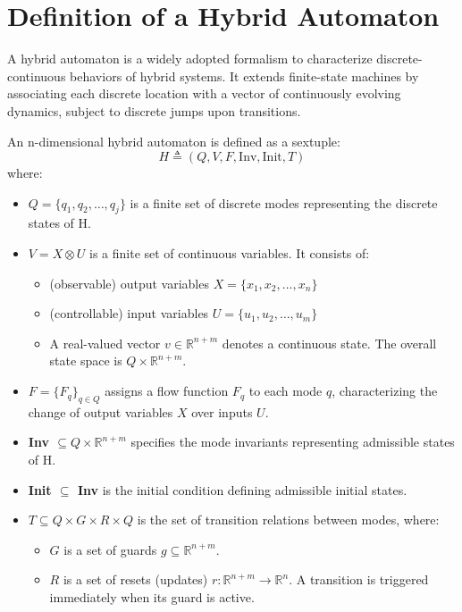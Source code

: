 \documentclass{article}
\begin{document}
\section*{Definition of a Hybrid Automaton}

A hybrid automaton is a widely adopted formalism to characterize discrete-continuous behaviors of hybrid systems. It extends finite-state machines by associating each discrete location with a vector of continuously evolving dynamics, subject to discrete jumps upon transitions.

An n-dimensional hybrid automaton is defined as a sextuple:
$$ H \triangleq (Q, V, F, \text{Inv}, \text{Init}, T) $$
where:
\begin{itemize}
    \item \textbf{$Q = \{q_1, q_2, \dots, q_j\}$} is a finite set of discrete modes representing the discrete states of H.
    
    \item \textbf{$V = X \otimes U$} is a finite set of continuous variables. It consists of:
    \begin{itemize}
        \item (observable) output variables \textbf{$X = \{x_1, x_2, \dots, x_n\}$}
        \item (controllable) input variables \textbf{$U = \{u_1, u_2, \dots, u_m\}$}
        \item A real-valued vector $v \in \mathbb{R}^{n+m}$ denotes a continuous state. The overall state space is $Q \times \mathbb{R}^{n+m}$.
    \end{itemize}
    
    \item \textbf{$F = \{F_q\}_{q \in Q}$} assigns a flow function $F_q$ to each mode $q$, characterizing the change of output variables $X$ over inputs $U$.
    
    \item \textbf{Inv $\subseteq Q \times \mathbb{R}^{n+m}$} specifies the mode invariants representing admissible states of H.
    
    \item \textbf{Init $\subseteq$ Inv} is the initial condition defining admissible initial states.
    
    \item \textbf{$T \subseteq Q \times G \times R \times Q$} is the set of transition relations between modes, where:
    \begin{itemize}
        \item \textbf{$G$} is a set of guards $g \subseteq \mathbb{R}^{n+m}$.
        \item \textbf{$R$} is a set of resets (updates) $r: \mathbb{R}^{n+m} \to \mathbb{R}^n$. A transition is triggered immediately when its guard is active.
    \end{itemize}
\end{itemize}
\end{document}
